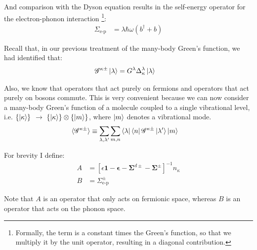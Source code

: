 And comparison with the Dyson equation results in the self-energy operator for the electron-phonon interaction \footnote{Formally, the term is a constant times the Green's function, so that we multiply it by the unit operator, resulting in a diagonal contribution.}:
\begin{align*}
\Sigma_\text{e-p} &= \lambda \hbar \omega ( b^\dagger + b)
\end{align*}

Recall that, in our previous treatment of the many-body Green's function, we had identified that:
\begin{align*}
\mathscr{G}^{\kappa\pm} \ket{\lambda} &= G^\lambda \Delta^\lambda_\kappa \ket{\lambda}
\end{align*}

Also, we know that operators that act purely on fermions and operators that act purely on bosons commute. This is very convenient because we can now consider a many-body Green's function of a molecule coupled to a single vibrational level, i.e. $\left\{\ket{\kappa}\right\} $ $\rightarrow$ $ \left\{\ket{\kappa}\right\} \otimes \left\{\ket{m}\right\}$, where $\ket{m}$ denotes a vibrational mode.
\begin{align*}
\braket{\mathscr{G}^{\kappa\pm}} &\equiv \sum_{\lambda, \lambda^\prime} \sum_{m,n} \bra{\lambda}\bra{n} \mathscr{G}^{\kappa\pm} \ket{\lambda^\prime}\ket{m} 
\end{align*}

For brevity I define:
\begin{align*}
A &=\left[ \epsilon \mathbf{1} - \mathbf{\epsilon} - \mathbf{\Sigma}^{d\pm} - \mathbf{\Sigma}^\pm \right]^{-1} n_\kappa \\
B &= \Sigma^\pm_\text{e-p}
\end{align*}

Note that $A$ is an operator that only acts on fermionic space, whereas $B$ is an operator that acts on the phonon space. 

